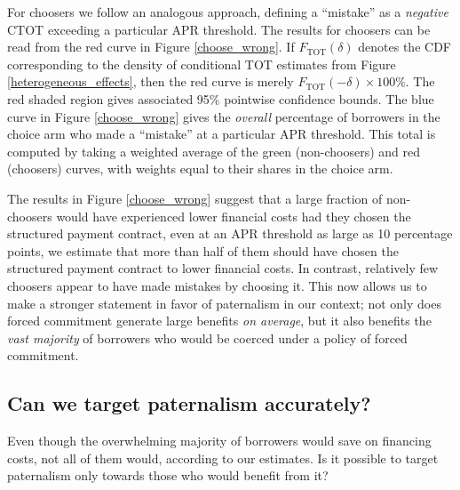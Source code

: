 \documentclass[12pt, a4paper]{article}
\begin{document}
For choosers we follow an analogous approach, defining a ``mistake'' as a \emph{negative} CTOT exceeding a particular APR threshold.
The results for choosers can be read from the red curve in Figure \ref{choose_wrong}.
If $F_{\text{TOT}}(\delta)$ denotes the CDF corresponding to the density of conditional TOT estimates from Figure \ref{heterogeneous_effects}, then the red curve is merely $F_{\text{TOT}}(-\delta) \times 100\%$.
The red shaded region gives associated 95\% pointwise confidence bounds.
The blue curve in Figure \ref{choose_wrong} gives the \emph{overall} percentage of borrowers in the choice arm who made a ``mistake'' at a particular APR threshold.
This total is computed by taking a weighted average of the green (non-choosers) and red (choosers) curves, with weights equal to their shares in the choice arm.%



The results in Figure \ref{choose_wrong} suggest that a large fraction of non-choosers would have experienced lower financial costs had they chosen the structured payment contract, even at an APR threshold as large as 10 percentage points, we estimate that more than half of them should have chosen the structured payment contract to lower financial costs.
In contrast, relatively few choosers appear to have made mistakes by choosing it.
This now allows us to make a stronger statement in favor of paternalism in our context; not only does forced commitment generate large benefits \textit{on average}, but it also benefits the \emph{vast majority} of borrowers who would be coerced under a policy of forced commitment.



\subsection{Can we target paternalism accurately?}

Even though the overwhelming majority of borrowers would save on financing costs, not all of them would, according to our estimates. Is it possible to target paternalism only towards those who would benefit from it?  
\end{document}
